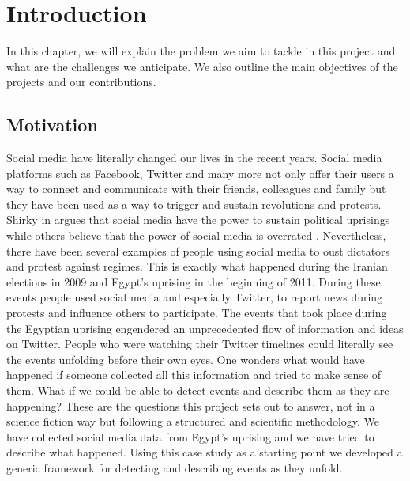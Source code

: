 \textbf{}%
\chapter{Introduction}\label{Introduction}

\ifpdf
    \graphicspath{{Introduction/IntroductionFigs/PNG/}{Introduction/IntroductionFigs/PDF/}{Introduction/IntroductionFigs/}}
\else
    \graphicspath{{Introduction/IntroductionFigs/EPS/}{Introduction/IntroductionFigs/}}
\fi

In this chapter, we will explain the problem we aim to tackle in this project and what are the challenges we anticipate. We also outline 
the main objectives of the projects and our contributions. 

\section{Motivation}
Social media have literally changed our lives in the recent years. Social media platforms such as Facebook, Twitter
and many more not only offer their users a way to connect and communicate with their friends, colleagues and
family but they have been used as a way to trigger and sustain revolutions and protests. Shirky in \citep{Shirky} argues that
social media have the power to sustain political uprisings while others believe that the power of social media is
overrated \citep{Morozov}. Nevertheless, there have been several examples of people using social media to oust dictators and
protest against regimes. This is exactly what happened during the Iranian elections in 2009 and Egypt's uprising in
the beginning of 2011. During these events people used social media and especially Twitter, to report news during
protests and influence others to participate.
The events that took place during the Egyptian uprising engendered an unprecedented flow of information and
ideas on Twitter. People who were watching their Twitter timelines could literally see the events unfolding 
before their own eyes. One wonders what would have happened if someone collected all this information and tried
to make sense of them. What if we could be able to detect events and describe them as they are happening?
These are the questions this project sets out
to answer, not in a science fiction way but following a structured and scientific methodology. We have collected
social media data from Egypt's uprising and we have tried to describe what happened. Using this case study as a 
starting point we developed a generic framework for detecting and describing events as they unfold.\\\\
